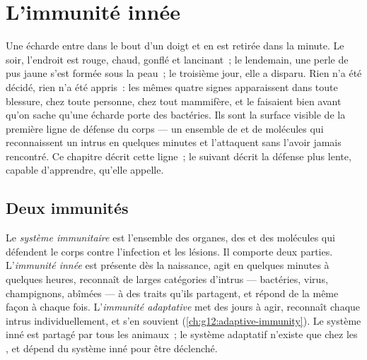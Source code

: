 \chapter{L'immunité innée}\label{ch:g12:innate-immunity}

Une écharde entre dans le bout d'un doigt et en est retirée dans la
minute. Le soir, l'endroit est rouge, chaud, gonflé et lancinant~; le
lendemain, une perle de pus jaune s'est formée sous la peau~; le
troisième jour, elle a disparu. Rien n'a été décidé, rien n'a été
appris~: les mêmes quatre signes apparaissent dans toute blessure,
chez toute personne, chez tout mammifère, et le faisaient bien avant
qu'on sache qu'une écharde porte des bactéries. Ils sont la surface
visible de la première ligne de défense du corps --- un ensemble de
 et de molécules qui reconnaissent un intrus en quelques
minutes et l'attaquent sans l'avoir jamais rencontré. Ce chapitre
décrit cette ligne~; le suivant décrit la défense plus lente, capable
d'apprendre, qu'elle appelle.

\section{Deux immunités}

\begin{definition}\label{def:g12:innate-immunity:immunity}
Le \emph{système immunitaire} est
l'ensemble des organes, des  et des molécules qui défendent le
corps contre l'infection et les lésions. Il comporte deux parties.
L'\emph{immunité innée} est présente dès la
naissance, agit en quelques minutes à quelques heures, reconnaît de
larges catégories d'intrus --- bactéries, virus, champignons, 
abîmées --- à des traits qu'ils partagent, et répond de la même façon
à chaque fois. L'\emph{immunité adaptative}
met des jours à agir, reconnaît chaque intrus individuellement, et
s'en souvient (\cref{ch:g12:adaptive-immunity}). Le système inné est
partagé par tous les animaux~; le système adaptatif n'existe que chez
les , et dépend du système inné pour être déclenché.
\end{definition}


